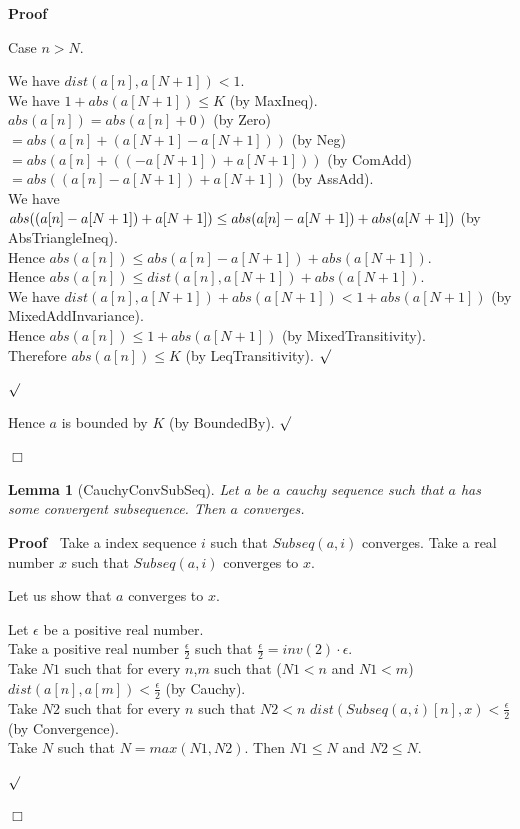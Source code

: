 \documentclass{article}
\newenvironment{forthel}{\begin{leftbar}}{\end{leftbar}}
\newenvironment{proof}{\noindent\textbf{Proof\ }}{\hspace*{\fill}$\Box$\medskip}
\newenvironment{subproof}{\begin{list}{}{}
		\item[\text{Proof}]}{\hfill $\surd$ \end{list}}
\newtheorem{lemma}{Lemma}
\newcommand{\halfeps}{\frac{\epsilon}{2}}
\newcommand{\dotequal}{=}
\begin{document}
\begin{forthel}
\begin{proof}
\begin{subproof}
\begin{subproof}
				Case $n > N$.
				
				\begin{subproof}
					We have $dist(a[n],a[N + 1]) < 1$.\\
					We have $1 + abs(a[N + 1]) \leq K$ (by MaxIneq).\\
					
					$abs(a[n]) \dotequal abs(a[n] + 0)$ (by Zero)\\					
					$\dotequal abs(a[n] + (a[N + 1] - a[N + 1]))$ (by Neg)\\
					$\dotequal abs(a[n] + ((-a[N + 1]) + a[N + 1]))$ (by ComAdd)\\
					$\dotequal abs((a[n] - a[N + 1]) + a[N + 1])$ (by AssAdd).\\
					
					We have $abs((a[n] - a[N + 1]) + a[N + 1])\\ \leq abs(a[n] - a[N + 1]) + abs(a[N + 1])$ (by AbsTriangleIneq).\\
					Hence $abs(a[n]) \leq abs(a[n] - a[N + 1]) + abs(a[N + 1])$.\\
					Hence $abs(a[n]) \leq dist(a[n],a[N + 1]) + abs(a[N + 1])$.\\
					We have $dist(a[n],a[N + 1]) + abs(a[N + 1]) < 1 + abs(a[N + 1])$ (by MixedAddInvariance).\\
					Hence $abs(a[n]) \leq 1 + abs(a[N + 1])$ (by MixedTransitivity).\\
					Therefore $abs(a[n]) \leq K$ (by LeqTransitivity).
				\end{subproof}
			\end{subproof}
			Hence $a$ is bounded by $K$ (by BoundedBy).
		\end{subproof}
	\end{proof}
	
	\begin{lemma}[CauchyConvSubSeq]
		Let a be $a$ cauchy sequence such that $a$ has some convergent subsequence. Then $a$ converges.
	\end{lemma}
	
	\begin{proof}
		Take a index sequence $i$ such that $Subseq(a,i)$ converges.
		Take a real number $x$ such that $Subseq(a,i)$ converges to $x$.
		
		\noindent Let us show that $a$ converges to $x$.
		\begin{subproof}
			Let $\epsilon$ be a positive real number.\\			
			Take a positive real number $\halfeps$ such that $\halfeps = inv(2) \cdot \epsilon$.\\
			Take $N1$ such that for every $n$,$m$ such that ($N1 < n$ and $N1 < m$) $dist(a[n],a[m]) < \halfeps$ (by Cauchy).\\
			Take $N2$ such that for every $n$ such that $N2 < n$ $dist(Subseq(a,i)[n],x) < \halfeps$ (by Convergence).\\
			Take $N$ such that $N = max(N1,N2)$. Then $N1 \leq N$ and $N2 \leq N$.
			

\end{subproof}
\end{proof}
\end{forthel}
\end{document}

